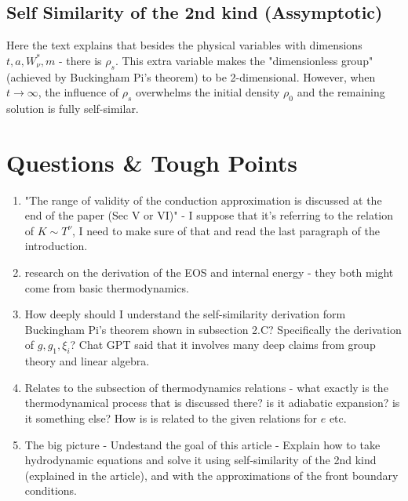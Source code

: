 \documentclass{article}
\begin{document}
\subsection{Self Similarity of the 2nd kind (Assymptotic)}
Here the text explains that besides the physical variables with dimensions $t, a, W_\nu^*, m$ - there is $\rho_s$.
This extra variable makes the "dimensionless group" (achieved by Buckingham Pi's theorem) to be 2-dimensional.
However, when $t \to \infty$, the influence of $\rho_s$ overwhelms the initial density $\rho_0$ and the remaining solution
is fully self-similar.

\subsection{}

\section{Questions \& Tough Points}
\begin{enumerate}
    \item "The range of validity of the conduction approximation is 
    discussed at the end of the paper (Sec V or VI)" 
    - I suppose that it's referring to the relation of $K \sim T^\nu$,
    I need to make sure of that and read the last paragraph of the introduction.
    \item research on the derivation of the EOS and internal energy - they both might
    come from basic thermodynamics.
    \item How deeply should I understand the self-similarity derivation form Buckingham Pi's theorem shown in subsection 2.C?
    Specifically the derivation of $g, g_1, \xi_i$? Chat GPT said that it involves many deep claims from group theory and linear algebra.
    \item Relates to the subsection of thermodynamics relations - what exactly is the thermodynamical process that is discussed
    there? is it adiabatic expansion? is it something else? How is is related to the given relations for $e$ etc.
    \item The big picture - Undestand the goal of this article - Explain how to take hydrodynamic equations
    and solve it using self-similarity of the 2nd kind (explained in the article), and with the approximations of the front boundary conditions.


\end{enumerate}
\end{document}
